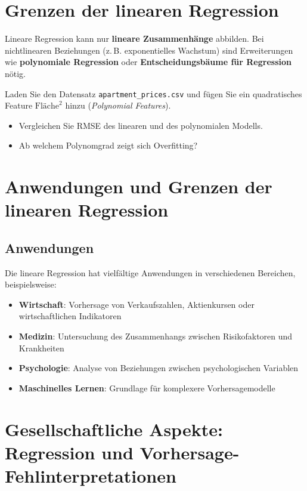 \section{Grenzen der linearen Regression}

\begin{mycaution}
Lineare Regression kann nur \textbf{lineare Zusammenhänge} abbilden.
Bei nichtlinearen Beziehungen (z.\,B. exponentielles Wachstum) sind Erweiterungen wie
\textbf{polynomiale Regression} oder \textbf{Entscheidungsbäume für Regression} nötig.
\end{mycaution}

\begin{mychallenge}
Laden Sie den Datensatz \texttt{apartment\_prices.csv} und fügen Sie ein quadratisches
Feature $\text{Fläche}^2$ hinzu (\emph{Polynomial Features}).
\begin{itemize}
    \item Vergleichen Sie RMSE des linearen und des polynomialen Modells.
    \item Ab welchem Polynomgrad zeigt sich Overfitting?
\end{itemize}
\end{mychallenge}

\section{Anwendungen und Grenzen der linearen Regression}

\subsection{Anwendungen}

Die lineare Regression hat vielfältige Anwendungen in verschiedenen Bereichen, beispielsweise:

\begin{itemize}
	\item \textbf{Wirtschaft}: Vorhersage von Verkaufszahlen, Aktienkursen oder wirtschaftlichen Indikatoren
	\item \textbf{Medizin}: Untersuchung des Zusammenhangs zwischen Risikofaktoren und Krankheiten
	\item \textbf{Psychologie}: Analyse von Beziehungen zwischen psychologischen Variablen
	\item \textbf{Maschinelles Lernen}: Grundlage für komplexere Vorhersagemodelle
\end{itemize}

\section{Gesellschaftliche Aspekte: Regression und Vorhersage-Fehlinterpretationen}


